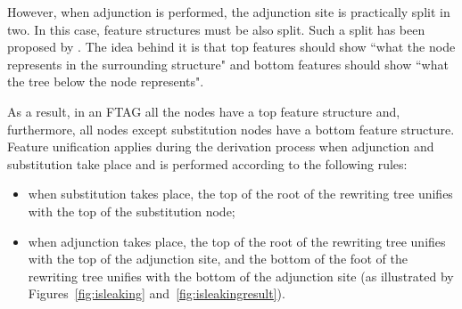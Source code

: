 However, when adjunction is performed, the adjunction site is practically split in two. In this case, feature structures must be also split. Such a split has been proposed by \citet{Vijay-ShankerJoshi:88}. The idea behind it is that top features should show ``what the node represents in the surrounding structure" and bottom features should show ``what the tree below the node represents".

As a result, in an FTAG all the nodes have a top feature structure and, furthermore, all nodes except substitution nodes have a bottom feature structure. Feature unification applies during the derivation process when adjunction and substitution take place and is performed according to the following rules:
\begin{itemize}
\item when substitution takes place, the top of the root of the rewriting tree unifies with the top of the substitution node;
\item when adjunction takes place, the top of the root of the rewriting tree unifies with the top of the adjunction site, and the bottom of the foot of the rewriting tree unifies with the bottom of the adjunction site (as illustrated by Figures~\ref{fig:isleaking} and~\ref{fig:isleakingresult}).
\end{itemize}

